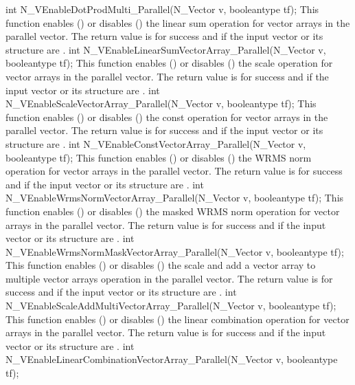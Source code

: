 {
  int N\_VEnableDotProdMulti\_Parallel(N\_Vector v, booleantype tf);
}
{
  This function enables () or disables () the linear sum
  operation for vector arrays in the parallel vector. The return value is  for
  success and  if the input vector or its  structure are .
}
{
  int N\_VEnableLinearSumVectorArray\_Parallel(N\_Vector v, booleantype tf);
}
{
  This function enables () or disables () the scale
  operation for vector arrays in the parallel vector. The return value is  for
  success and  if the input vector or its  structure are .
}
{
  int N\_VEnableScaleVectorArray\_Parallel(N\_Vector v, booleantype tf);
}
{
  This function enables () or disables () the const
  operation for vector arrays in the parallel vector. The return value is  for
  success and  if the input vector or its  structure are .
}
{
  int N\_VEnableConstVectorArray\_Parallel(N\_Vector v, booleantype tf);
}
{
  This function enables () or disables () the WRMS norm
  operation for vector arrays in the parallel vector. The return value is  for
  success and  if the input vector or its  structure are .
}
{
  int N\_VEnableWrmsNormVectorArray\_Parallel(N\_Vector v, booleantype tf);
}
{
  This function enables () or disables () the masked WRMS
  norm operation for vector arrays in the parallel vector. The return value is
   for success and  if the input vector or its  structure are
  .
}
{
  int N\_VEnableWrmsNormMaskVectorArray\_Parallel(N\_Vector v, booleantype tf);
}
{
  This function enables () or disables () the scale and
  add a vector array to multiple vector arrays operation in the parallel vector. The
  return value is  for success and  if the input vector or its
   structure are .
}
{
  int N\_VEnableScaleAddMultiVectorArray\_Parallel(N\_Vector v,
  booleantype tf);
}
{
  This function enables () or disables () the linear
  combination operation for vector arrays in the parallel vector. The return value
  is  for success and  if the input vector or its  structure
  are .
}
{
  int N\_VEnableLinearCombinationVectorArray\_Parallel(N\_Vector v,
  booleantype tf);
}

